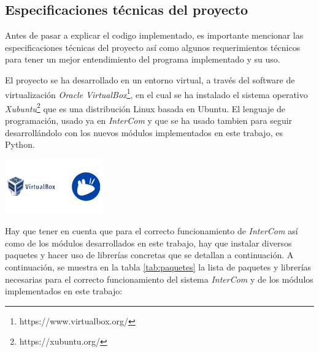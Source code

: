\label{sec:metodologia}

\subsection{Especificaciones técnicas del proyecto}

Antes de pasar a explicar el codigo implementado, es importante mencionar las especificaciones técnicas del proyecto así como algunos requerimientos técnicos para tener un mejor entendimiento del programa implementado y su uso. 
\vspace{\baselineskip}

El proyecto se ha desarrollado en un entorno virtual, a través del software de virtualización \textit{Oracle VirtualBox}\footnote{https://www.virtualbox.org/}, en el cual se ha instalado el sistema operativo \textit{Xubuntu}\footnote{https://xubuntu.org/} que es una distribución Linux basada en Ubuntu. El lenguaje de programación, usado ya en \textit{InterCom} y que se ha usado tambien para seguir desarrollándolo con los nuevos módulos implementados en este trabajo, es Python. 
\vspace{\baselineskip}

\begin{center}
	\includegraphics[width = 0.32\textwidth]{images/oracle_xubuntu.png}
	\label{fig:oraclexubuntu}
\end{center}

\vspace{\baselineskip}

Hay que tener en cuenta que para el correcto funcionamiento de \textit{InterCom} así como de los módulos desarrollados en este trabajo, hay que instalar diversos paquetes y hacer uso de librerías concretas que se detallan a continuación. A continuación, se muestra en la tabla \ref{tab:paquetes} la lista de paquetes y librerías necesarias para el correcto funcionamiento del sistema \textit{InterCom} y de los módulos implementados en este trabajo:

